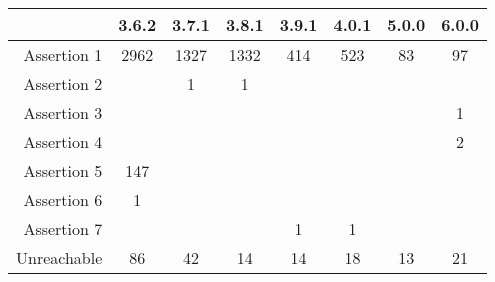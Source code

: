 \begin{tabular}{r|ccccccc}
\toprule
{} & 3.6.2 & 3.7.1 & 3.8.1 & 3.9.1 & 4.0.1 & 5.0.0 & 6.0.0 \\
\midrule
Assertion 1 &  2962 &  1327 &  1332 &   414 &   523 &    83 &    97 \\
Assertion 2 &       &     1 &     1 &       &       &       &       \\
Assertion 3 &       &       &       &       &       &       &     1 \\
Assertion 4 &       &       &       &       &       &       &     2 \\
Assertion 5 &   147 &       &       &       &       &       &       \\
Assertion 6 &     1 &       &       &       &       &       &       \\
Assertion 7 &       &       &       &     1 &     1 &       &       \\
Unreachable &    86 &    42 &    14 &    14 &    18 &    13 &    21 \\
\bottomrule
\end{tabular}
